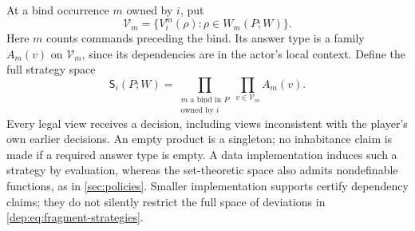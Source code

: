 At a bind occurrence $m$ owned by $i$, put
\[
 \mathcal V_m=\{V_i^m(\rho):\rho\in W_m(P;W)\}.
\]
Here $m$ counts commands preceding the bind. Its answer type is a
family $A_m(v)$ on $\mathcal V_m$, since its dependencies are in
the actor's local context. Define the full strategy space
\begin{equation}\label{dep:eq:fragment-strategies}
 \mathsf S_i(P;W)=
 \prod_{\substack{m\text{ a bind in }P\\\text{owned by }i}}
       \prod_{v\in\mathcal V_m} A_m(v).
\end{equation}
Every legal view receives a decision, including views inconsistent with
the player's own earlier decisions. An empty product is a singleton;
no inhabitance claim is made if a required answer type is empty.
A data implementation induces such a strategy by evaluation, whereas
the set-theoretic space also admits nondefinable functions, as in
\cref{sec:policies}. Smaller implementation supports certify dependency
claims; they do not silently restrict the full space of deviations in
\eqref{dep:eq:fragment-strategies}.

